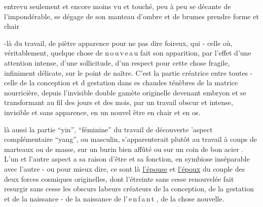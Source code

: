 
entrevu seulement et encore moins vu et touché,  peu à peu se   décante de l'impondérable, se dégage de son manteau d'ombre et de brumes   prendre forme et chair  

   -là du travail, de piètre apparence pour ne pas dire  foireux, qui     - celle où, véritablement, quelque chose de \mbox{n\,o\,u\,v\,e\,a\,u} fait son apparition, par l'effet d'une attention intense, d'une sollicitude, d'un respect pour cette chose fragile, infiniment délicate, sur le point de naître. C'est la partie créatrice entre toutes - celle de la conception et d  gestation  dans es chaudes ténèbres de la matrice nourricière,  depuis l'invisible double gamète  originelle\handwritten{,} devenant  embryon et se transformant au fil des jours et des mois, par un travail obscur et intense, invisible et sans apparence, en un nouvel être en chair et en os.

 là aussi la partie  ``yin'', ``féminine\deleted{\unsure{,}}'' du travail de découverte\deleted{-}  'aspect complémentaire ``yang'', ou masculin, s'apparenterait plutôt  au travail à coups de marteaux ou de masse, sur un burin bien affûté ou sur un coin de bon acier . L'un et l'autre aspect a sa raison d'être et sa fonction, en symbiose inséparable  avec l'autre - ou pour mieux dire, ce sont là \uline{l'épouse} et \uline{l'époux} du couple des deux forces cosmiques originelles, dont l'étreinte  sans cesse renouvelée fait resurgir sans cesse les obscurs labeurs créateurs de la conception, de la gestation et de la naissance - de la naissance de \mbox{l'\,e\,n\,f\,a\,n\,t} , de la chose nouvelle.

